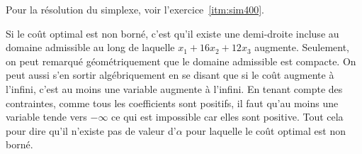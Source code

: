 \begin{enumerate}
    \begin{solution}
      Pour la résolution du simplexe, voir l'exercice~\ref{itm:sim400}.

      Si le coût optimal est non borné,
      c'est qu'il existe une demi-droite incluse au domaine admissible
      au long de laquelle $x_1 + 16x_2 + 12x_3$ augmente.
      Seulement, on peut remarqué géométriquement que le domaine admissible
      est compacte.
      On peut aussi s'en sortir algébriquement en se disant que
      si le coût augmente à l'infini, c'est au moins une variable augmente
      à l'infini.
      En tenant compte des contraintes, comme tous les coefficients
      sont positifs, il faut qu'au moins une variable tende vers
      $-\infty$ ce qui est impossible car elles sont positive.
      Tout cela pour dire qu'il n'existe pas de valeur d'$\alpha$
      pour laquelle le coût optimal est non borné.
    \end{solution}

\end{enumerate}
